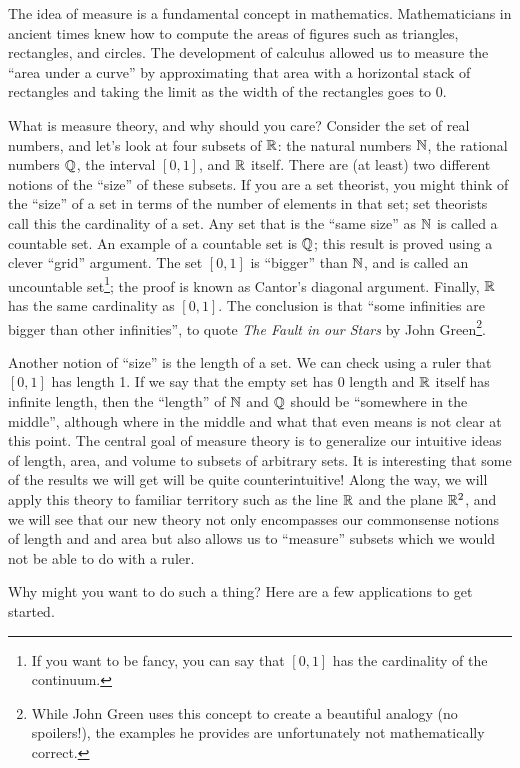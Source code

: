 \documentclass[main.tex]{subfiles}
\begin{document}
The idea of measure is a fundamental concept in mathematics. Mathematicians in ancient times knew how to compute the areas of figures such as triangles, rectangles, and circles. The development of calculus allowed us to measure the ``area under a curve'' by approximating that area with a horizontal stack of rectangles and taking the limit as the width of the rectangles goes to 0.

What is measure theory, and why should you care? Consider the set of real numbers, and let's look at four subsets of ${\mathbb R}$: the natural numbers ${\mathbb N}$, the rational numbers $\mathbb{Q}$, the interval $[0, 1]$, and ${\mathbb R}$ itself. There are (at least) two different notions of the ``size'' of these subsets. If you are a set theorist, you might think of the ``size'' of a set in terms of the number of elements in that set; set theorists call this the cardinality of a set. Any set that is the ``same size'' as ${\mathbb N}$ is called a countable set. An example of a countable set is $\mathbb{Q}$; this result is proved using a clever ``grid''
argument. The set $[0, 1]$ is ``bigger'' than ${\mathbb N}$, and is called an uncountable set\footnote{If you want to be fancy, you can say that $[0,1]$ has the cardinality of the continuum.}; the proof is known as Cantor's diagonal argument. Finally, ${\mathbb R}$ has the same cardinality as $[0,1]$. The conclusion is that ``some infinities are bigger than other infinities'', to quote \emph{The Fault in our Stars} by John Green\footnote{While John Green uses this concept to create a beautiful analogy (no spoilers!), the examples he provides are unfortunately not mathematically correct.}.

Another notion of ``size'' is the length of a set. We can check using a ruler that $[0, 1]$ has length 1. If we say that the empty set has 0 length and ${\mathbb R}$ itself has infinite length, then the ``length'' of ${\mathbb N}$ and $\mathbb{Q}$ should be ``somewhere in the middle'', although where in the middle and what that even means is not clear at this point. The central goal of measure theory is to generalize our intuitive ideas of length, area, and volume to subsets of arbitrary sets. It is interesting that some of the results we will get will be quite counterintuitive! Along the way, we will apply this theory to familiar territory such as the line ${\mathbb R}$ and the plane ${\mathbb R}^2$, and we will see that our new theory not only encompasses our commonsense notions of length and and area but also allows us to ``measure'' subsets which we would not be able to do with a ruler.

Why might you want to do such a thing? Here are a few applications to get started.
\end{document}
